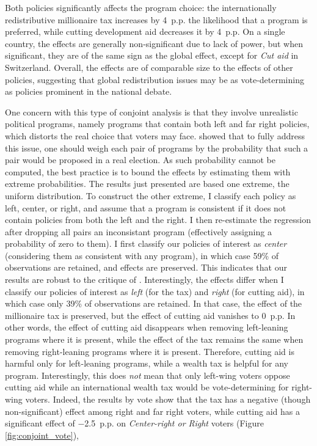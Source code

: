\documentclass[12pt,english]{article}
\begin{document}
\begin{bibunit}
\begin{figure}[h!]
\begin{subfigure}{.49\textwidth}
\end{subfigure}
\end{figure}

Both policies significantly affects the program choice: the internationally redistributive millionaire tax increases by 4~p.p. the likelihood that a program is preferred, while cutting development aid decreases it by 4~p.p. On a single country, the effects are generally non-significant due to lack of power, but when significant, they are of the same sign as the global effect, except for \textit{Cut aid} in Switzerland. Overall, the effects are of comparable size to the effects of other policies, %
suggesting that global redistribution issues may be as vote-determining as policies prominent in the national debate. 

One concern with this type of conjoint analysis is that they involve unrealistic political programs, namely programs that contain both left and far right policies, which distorts the real choice that voters may face. \cite{cuesta_improving_2022} showed that to fully address this issue, one should weigh each pair of programs by the probability that such a pair would be proposed in a real election. As such probability cannot be computed, the best practice is to bound the effects by estimating them with extreme probabilities. The results just presented are based one extreme, the uniform distribution. To construct the other extreme, I classify each policy as left, center, or right, and assume that a program is consistent if it does not contain policies from both the left and the right. I then re-estimate the regression after dropping all pairs an inconsistant program (effectively assigning a probability of zero to them). I first classify our policies of interest as \textit{center} (considering them as consistent with any program), in which case 59\% of observations are retained, and effects are preserved. This indicates that our results are robust to the critique of \cite{cuesta_improving_2022}. Interestingly, the effects differ when I classify our policies of interest as \textit{left} (for the tax) and \textit{right} (for cutting aid), in which case only 39\% of observations are retained. In that case, the effect of the millionaire tax is preserved, but the effect of cutting aid vanishes to 0~p.p. In other words, the effect of cutting aid disappears when removing left-leaning programs where it is present, while the effect of the tax remains the same when removing right-leaning programs where it is present. Therefore, cutting aid is harmful only for left-leaning programs, while a wealth tax is helpful for any program. Interestingly, this does \textit{not} mean that only left-wing voters oppose cutting aid while an international wealth tax would be vote-determining for right-wing voters. %
Indeed, the results by vote show that the tax has a negative (though non-significant) effect among right and far right voters, while cutting aid has a significant effect of $-$2.5~p.p. on \textit{Center-right or Right} voters (Figure \ref{fig:conjoint_vote}), 



\end{bibunit}
\end{document}
